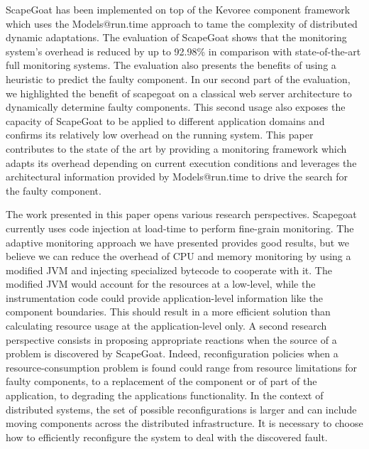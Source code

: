 ScapeGoat has been implemented on top of the Kevoree component framework which uses the Models@run.time approach to tame the complexity of distributed dynamic adaptations.
The evaluation of ScapeGoat shows that the monitoring system's overhead is reduced by up to 92.98\% in comparison with state-of-the-art full monitoring systems. 
The evaluation also presents the benefits of using a heuristic to predict the faulty component.
In our second part of the evaluation, we highlighted the benefit of scapegoat on a classical web server architecture to dynamically determine faulty components.
This second usage also exposes the capacity of ScapeGoat to be applied to different application domains and confirms its relatively low overhead on the running system.
This paper contributes to the state of the art by providing a monitoring framework which adapts its overhead depending on current execution conditions and leverages the architectural information provided by Models@run.time to drive the search for the faulty component.

The work presented in this paper opens various research perspectives. 
Scapegoat currently uses code injection at load-time to perform fine-grain monitoring. 
The adaptive monitoring approach we have presented provides good results, but we believe we can reduce the overhead of CPU and memory monitoring by using a modified JVM and injecting specialized bytecode to cooperate with it.
The modified JVM would account for the resources at a low-level, while the instrumentation code could provide application-level information like the component boundaries. 
This should result in a more efficient solution than calculating resource usage at the application-level only.
A second research perspective consists in proposing appropriate reactions when the source of a problem is discovered by ScapeGoat. 
Indeed, reconfiguration policies when a resource-consumption problem is found could range from resource limitations for faulty components, to a replacement of the component or of part of the application, to degrading the applications functionality.
In the context of distributed systems, the set of possible reconfigurations is larger and can include moving components across the distributed infrastructure.
It is necessary to choose how to efficiently reconfigure the system to deal with the discovered fault.
